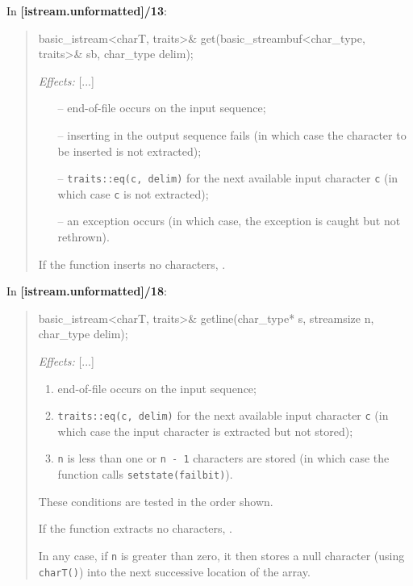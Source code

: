 \documentclass{wg21}
\begin{document}
In \textbf{[istream.unformatted]/13}:
\begin{quote}
\begin{codeblock}
basic_istream<charT, traits>& get(basic_streambuf<char_type, traits>& sb, char_type delim);
\end{codeblock}
\textit{Effects:} [...]
\begin{itemize}
  \item[--] end-of-file occurs on the input sequence;
  \item[--] inserting in the output sequence fails (in which case the character
            to be inserted is not extracted);
  \item[--] \texttt{traits::eq(c, delim)} for the next available input character
            \texttt{c} (in which case \texttt{c} is not extracted);
  \item[--] an exception occurs (in which case, the exception is caught
            but not rethrown).
\end{itemize}
If the function inserts no characters, .
\end{quote}

In \textbf{[istream.unformatted]/18}:
\begin{quote}
\begin{codeblock}
basic_istream<charT, traits>& getline(char_type* s, streamsize n, char_type delim);
\end{codeblock}
\textit{Effects:} [...]
\begin{enumerate}
  \item end-of-file occurs on the input sequence;
  \item \texttt{traits::eq(c, delim)} for the next available input character
        \texttt{c} (in which case the input character is extracted but not stored);
  \item \texttt{n} is less than one or \texttt{n - 1} characters are stored
        (in which case the function calls \texttt{setstate(failbit)}).
\end{enumerate}

These conditions are tested in the order shown.

If the function extracts no characters, .

In any case, if \texttt{n} is greater than zero, it then stores a null character
(using \texttt{charT()}) into the next successive location of the array.
\end{quote}
\end{document}
